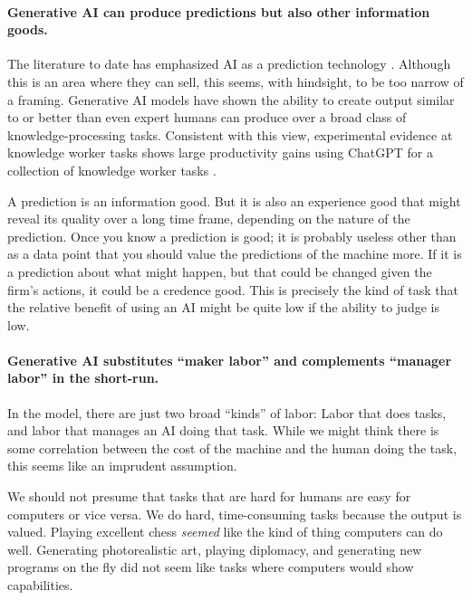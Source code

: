 \documentclass{article}
\begin{document}
\paragraph{Generative AI can produce predictions but also other information goods.}
The literature to date has emphasized AI as a prediction technology \citep{agrawal2019}. 
Although this is an area where they can sell, this seems, with hindsight, to be too narrow of a framing.
Generative AI models have shown the ability to create output similar to or better than even expert humans can produce over a broad class of knowledge-processing tasks.  
Consistent with this view, experimental evidence at knowledge worker tasks shows large productivity gains using ChatGPT for a collection of knowledge worker tasks \citep{noy2023experimental}.

A prediction is an information good. 
But it is also an experience good that might reveal its quality over a long time frame, depending on the nature of the prediction. 
Once you know a prediction is good; it is probably useless other than as a data point that you should value the predictions of the machine more.
If it is a prediction about what might happen, but that could be changed given the firm's actions, it could be a credence good.
This is precisely the kind of task that the relative benefit of using an AI might be quite low if the ability to judge is low. 

\paragraph{Generative AI substitutes ``maker labor'' and complements ``manager labor'' in the short-run.}
In the model, there are just two broad ``kinds'' of labor: 
Labor that does tasks, and labor that manages an AI doing that task. 
While we might think there is some correlation between the cost of the machine and the human doing the task, this seems like an imprudent assumption.

We should not presume that tasks that are hard for humans are easy for computers or vice versa. 
We do hard, time-consuming tasks because the output is valued. 
Playing excellent chess \emph{seemed} like the kind of thing computers can do well. 
Generating photorealistic art, playing diplomacy, and generating new programs on the fly did not seem like tasks where computers would show capabilities.
\end{document}
